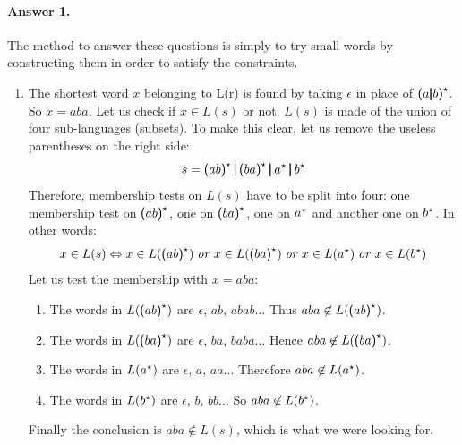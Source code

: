 \paragraph{Answer 1.} The method to answer these questions is simply
to try small words by constructing them in order to satisfy the
constraints.
\begin{enumerate}

  \item \label{aba} The shortest word \(x\) belonging to L(r) is found
    by taking \(\epsilon\) in place of \(\textsf{(} a \pmb{\lvert}{}
    b\textsf{)}^{\star}\). So \(x = aba\). Let us check if \(x \in L(s)\)
    or not. \(L(s)\) is made of the union of four sub-languages
    (subsets). To make this clear, let us remove the useless
    parentheses on the right side:
    \[
    s = \textsf{(} ab \textsf{)}^{\star}{} \, \pmb{\lvert}{} \, \textsf{(} ba
    \textsf{)}^{\star}{} \, \pmb{\lvert}{} \, a^{\star}{} \, \pmb{\lvert}{} \,
    b^{\star}
    \]
    Therefore, membership tests on \(L(s)\) have to be split into
    four: one membership test on \(\textsf{(} ab \textsf{)}^{\star}\), one
    on \(\textsf{(} ba \textsf{)}^{\star}\), one on \(a^{\star}\) and
    another one on \(b^{\star}\). In other words:
    \[
     x \in L(s) \Leftrightarrow x \in L(\textsf{(} ab \textsf{)}^{\star}) \;
     \text{\emph{or}} \; x \in L(\textsf{(} ba \textsf{)}^{\star}) \;
     \text{\emph{or}} \; x \in L(a^{\star}) \; \text{\emph{or}} \; x
     \in L(b^{\star})
    \]
    Let us test the membership with \(x = aba\):
    \begin{enumerate}

      \item The words in \(L(\textsf{(} ab \textsf{)}^{\star})\) are
        \(\epsilon\), \(ab\), \(abab\ldots\) Thus \(aba \not\in
        L(\textsf{(} ab \textsf{)}^{\star})\).

      \item The words in \(L(\textsf{(} ba \textsf{)}^{\star})\) are
        \(\epsilon\), \(ba\), \(baba\ldots\) Hence \(aba \not\in
        L(\textsf{(} ba \textsf{)}^{\star})\).

      \item The words in \(L(a^{\star})\) are \(\epsilon\), \(a\),
        \(aa\ldots\) Therefore \(aba \not\in L(a^{\star})\).

      \item The words in \(L(b^{\star})\) are \(\epsilon\), \(b\),
        \(bb\ldots\) So \(aba \not\in L(b^{\star})\).

    \end{enumerate}
    Finally the conclusion is \(aba \not\in L(s)\), which is what we
    were looking for.


\end{enumerate}
